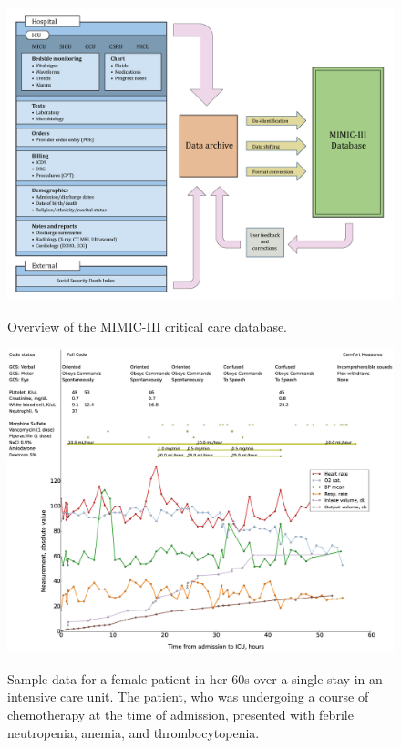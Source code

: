 \documentclass[english]{article}
\begin{document}
\begin{center}

\begin{figure}
\includegraphics[width=\textwidth]{MIMICData.png}
\label{fig:mimicoverview}
\caption{Overview of the MIMIC-III critical care database.}
\end{figure}

\begin{figure}
\includegraphics[width=\textwidth]{examplepatient.jpg}
\label{fig:examplepatient}
\caption{Sample data for a female patient in her 60s over a single stay in an intensive care unit. The patient, who was undergoing a course of chemotherapy at the time of admission, presented with febrile neutropenia, anemia, and thrombocytopenia.}
\end{figure}

\end{center}
\end{document}
